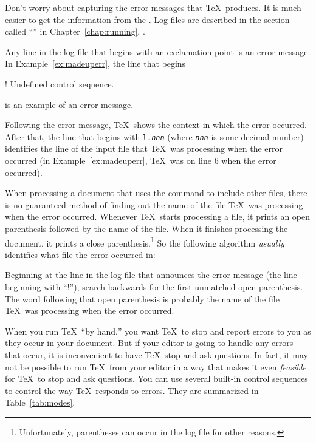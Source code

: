 \begin{iplist}{.25in}

Don't worry about capturing the error messages that \TeX\ produces.
It is much easier to get the 
information from the .
Log files are described in the section called ``''
in Chapter~\ref{chap:running}, {\it {}}.


Any line in the log file that begins with an exclamation point is an
error message.  In Example~\ref{ex:madeuperr}, the line that begins

\begin{shortexample}
! Undefined control sequence.
\end{shortexample}

is an example of an error message.


Following the error message, \TeX\ shows the context in which the error
occurred.  After that, the line that begins with \texttt{l.\textit{nnn}} (where
\texttt{\textit{nnn}} is some decimal number) identifies the line of the input
file that \TeX\ was processing when the error occurred (in
Example~\ref{ex:madeuperr}, \TeX\ was on line 6 when the error occurred).


When processing a document that uses the  command to
include other files, there is no
guaranteed method of finding out the name of the file \TeX\ was
processing when the error occurred.
Whenever \TeX\ starts processing a file, it prints an open parenthesis
followed by the name of the file.  When it finishes processing the
document, it prints a close parenthesis.\footnote{Unfortunately,
parentheses can occur in the log file for other reasons.}  So
the following algorithm {\em usually\/} identifies what file the error
occurred in:

Beginning at the line in the log file that announces the error message
(the line beginning with ``!''), search backwards for the first
unmatched open parenthesis.  The word following that open parenthesis
is probably the name of the file \TeX\ was processing when the
error occurred.

\pagebreak
{}

When you run \TeX\ ``by hand,'' you want \TeX\ to stop and report
errors to you as they occur in your document.  But if your editor is
going to handle any errors that occur, it is inconvenient to have
\TeX\ stop and ask questions.  In fact, it may not be possible to run
\TeX\ from your editor in a way that makes it even {\em feasible\/}
for \TeX\ to stop and ask questions.  You can use several built-in
control sequences to control the way \TeX\ responds to errors.  They
are summarized in Table~\ref{tab:modes}.


\end{iplist}
